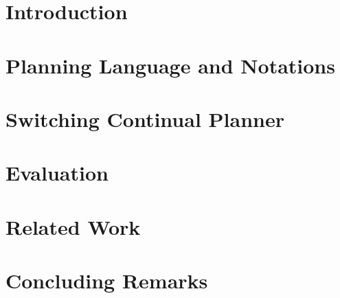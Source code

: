 \documentclass[letterpaper]{article}
\begin{document}
\section{Introduction}



\section{Planning Language and Notations}


\section{Switching Continual Planner}


\section{Evaluation}



\section{Related Work}




\section{Concluding Remarks}





\end{document}
